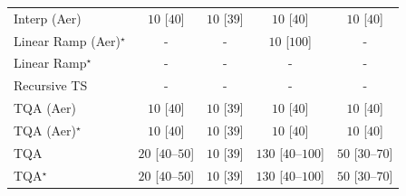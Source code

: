 \begin{tabular}{l|cccc|}
Interp (Aer) & {\cellcolor[HTML]{F7FCF5}} \color[HTML]{000000} $10$ [$40$] & {\cellcolor[HTML]{F7FCF5}} \color[HTML]{000000} $10$ [$39$] & {\cellcolor[HTML]{F7FCF5}} \color[HTML]{000000} $10$ [$40$] & {\cellcolor[HTML]{F7FCF5}} \color[HTML]{000000} $10$ [$40$] \\
Linear Ramp (Aer)$^\star$ & {\cellcolor[HTML]{000000}} \color[HTML]{F1F1F1} {\cellcolor{white}} \color{black} - & {\cellcolor[HTML]{000000}} \color[HTML]{F1F1F1} {\cellcolor{white}} \color{black} - & {\cellcolor[HTML]{F7FCF5}} \color[HTML]{000000} $10$ [$100$] & {\cellcolor[HTML]{000000}} \color[HTML]{F1F1F1} {\cellcolor{white}} \color{black} - \\
Linear Ramp$^\star$ & {\cellcolor[HTML]{000000}} \color[HTML]{F1F1F1} {\cellcolor{white}} \color{black} - & {\cellcolor[HTML]{000000}} \color[HTML]{F1F1F1} {\cellcolor{white}} \color{black} - & {\cellcolor[HTML]{000000}} \color[HTML]{F1F1F1} {\cellcolor{white}} \color{black} - & {\cellcolor[HTML]{000000}} \color[HTML]{F1F1F1} {\cellcolor{white}} \color{black} - \\
Recursive TS & {\cellcolor[HTML]{000000}} \color[HTML]{F1F1F1} {\cellcolor{white}} \color{black} - & {\cellcolor[HTML]{000000}} \color[HTML]{F1F1F1} {\cellcolor{white}} \color{black} - & {\cellcolor[HTML]{000000}} \color[HTML]{F1F1F1} {\cellcolor{white}} \color{black} - & {\cellcolor[HTML]{000000}} \color[HTML]{F1F1F1} {\cellcolor{white}} \color{black} - \\
TQA (Aer) & {\cellcolor[HTML]{F7FCF5}} \color[HTML]{000000} $10$ [$40$] & {\cellcolor[HTML]{F7FCF5}} \color[HTML]{000000} $10$ [$39$] & {\cellcolor[HTML]{F7FCF5}} \color[HTML]{000000} $10$ [$40$] & {\cellcolor[HTML]{F7FCF5}} \color[HTML]{000000} $10$ [$40$] \\
TQA (Aer)$^\star$ & {\cellcolor[HTML]{F7FCF5}} \color[HTML]{000000} $10$ [$40$] & {\cellcolor[HTML]{F7FCF5}} \color[HTML]{000000} $10$ [$39$] & {\cellcolor[HTML]{F7FCF5}} \color[HTML]{000000} $10$ [$40$] & {\cellcolor[HTML]{F7FCF5}} \color[HTML]{000000} $10$ [$40$] \\
TQA & {\cellcolor[HTML]{F5FBF3}} \color[HTML]{000000} $20$ [$40$--$50$] & {\cellcolor[HTML]{F7FCF5}} \color[HTML]{000000} $10$ [$39$] & {\cellcolor[HTML]{DFF3DA}} \color[HTML]{000000} $130$ [$40$--$100$] & {\cellcolor[HTML]{F0F9ED}} \color[HTML]{000000} $50$ [$30$--$70$] \\
TQA$^\star$ & {\cellcolor[HTML]{F5FBF3}} \color[HTML]{000000} $20$ [$40$--$50$] & {\cellcolor[HTML]{F7FCF5}} \color[HTML]{000000} $10$ [$39$] & {\cellcolor[HTML]{DFF3DA}} \color[HTML]{000000} $130$ [$40$--$100$] & {\cellcolor[HTML]{F0F9ED}} \color[HTML]{000000} $50$ [$30$--$70$] \\

\end{tabular}
